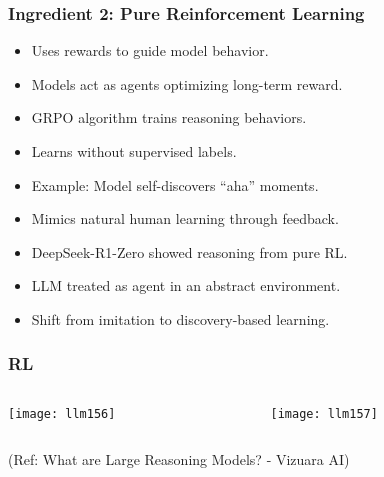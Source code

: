 \begin{frame}[fragile]\frametitle{Ingredient 2: Pure Reinforcement Learning}
\begin{itemize}
  \item Uses rewards to guide model behavior.
  \item Models act as agents optimizing long-term reward.
  \item GRPO algorithm trains reasoning behaviors.
  \item Learns without supervised labels.
  \item Example: Model self-discovers ``aha'' moments.
  \item Mimics natural human learning through feedback.
  \item DeepSeek-R1-Zero showed reasoning from pure RL.
  \item LLM treated as agent in an abstract environment.
  \item Shift from imitation to discovery-based learning.
\end{itemize}
\end{frame}

\begin{frame}[fragile]\frametitle{RL}


\begin{columns}
    \begin{column}[T]{0.5\linewidth}
		\begin{center}
		\texttt{[image: llm156]}
		\end{center}

    \end{column}
    \begin{column}[T]{0.5\linewidth}
		\begin{center}
		\texttt{[image: llm157]}
		\end{center}
    \end{column}
  \end{columns}
  

{\tiny (Ref: What are Large Reasoning Models? - Vizuara AI)}

\end{frame}

